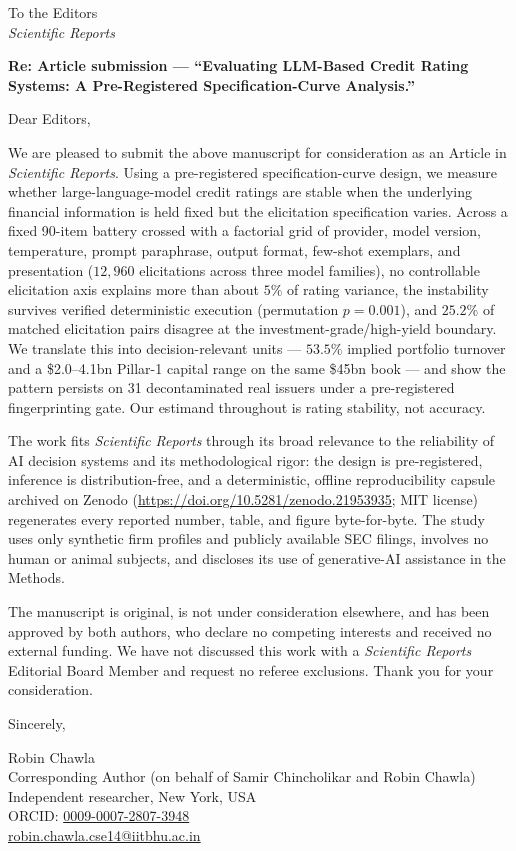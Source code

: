 \documentclass[11pt]{article}
\begin{document}
\noindent To the Editors\\
\emph{Scientific Reports}

\vspace{6pt}
\noindent\textbf{Re: Article submission --- ``Evaluating LLM-Based Credit Rating Systems: A Pre-Registered Specification-Curve Analysis.''}

\vspace{6pt}
\noindent Dear Editors,

We are pleased to submit the above manuscript for consideration as an Article in \emph{Scientific Reports}. Using a pre-registered specification-curve design, we measure whether large-language-model credit ratings are stable when the underlying financial information is held fixed but the elicitation specification varies. Across a fixed 90-item battery crossed with a factorial grid of provider, model version, temperature, prompt paraphrase, output format, few-shot exemplars, and presentation ($12{,}960$ elicitations across three model families), no controllable elicitation axis explains more than about $5\%$ of rating variance, the instability survives verified deterministic execution (permutation $p=0.001$), and $25.2\%$ of matched elicitation pairs disagree at the investment-grade/high-yield boundary. We translate this into decision-relevant units --- $53.5\%$ implied portfolio turnover and a \$2.0--4.1bn Pillar-1 capital range on the same \$45bn book --- and show the pattern persists on 31 decontaminated real issuers under a pre-registered fingerprinting gate. Our estimand throughout is rating stability, not accuracy.

The work fits \emph{Scientific Reports} through its broad relevance to the reliability of AI decision systems and its methodological rigor: the design is pre-registered, inference is distribution-free, and a deterministic, offline reproducibility capsule archived on Zenodo (\url{https://doi.org/10.5281/zenodo.21953935}; MIT license) regenerates every reported number, table, and figure byte-for-byte. The study uses only synthetic firm profiles and publicly available SEC filings, involves no human or animal subjects, and discloses its use of generative-AI assistance in the Methods.

The manuscript is original, is not under consideration elsewhere, and has been approved by both authors, who declare no competing interests and received no external funding. We have not discussed this work with a \emph{Scientific Reports} Editorial Board Member and request no referee exclusions. Thank you for your consideration.

\vspace{12pt}
\noindent Sincerely,

\vspace{2pt}
\noindent Robin Chawla\\
Corresponding Author (on behalf of Samir Chincholikar and Robin Chawla)\\
Independent researcher, New York, USA\\
ORCID: \href{https://orcid.org/0009-0007-2807-3948}{0009-0007-2807-3948}\\
\href{mailto:robin.chawla.cse14@iitbhu.ac.in}{robin.chawla.cse14@iitbhu.ac.in}
\end{document}
